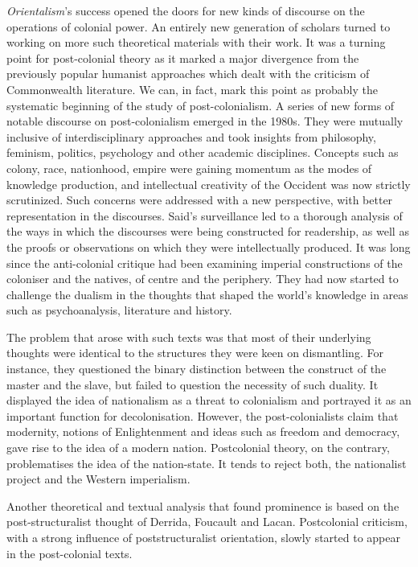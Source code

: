 \emph{Orientalism}’s success opened the doors for new kinds of discourse on the operations of colonial power. An entirely new generation of scholars turned to working on more such theoretical materials with their work. It was a turning point for post-colonial theory as it marked a major divergence from the previously popular humanist approaches which dealt with the criticism of Commonwealth literature. We can, in fact, mark this point as probably the systematic beginning of the study of post-colonialism. A series of new forms of notable discourse on post-colonialism emerged in the 1980s. They were mutually inclusive of interdisciplinary approaches and took insights from philosophy, feminism, politics, psychology and other academic disciplines. Concepts such as colony, race, nationhood, empire were gaining momentum as the modes of knowledge production, and intellectual creativity of the Occident was now strictly scrutinized. Such concerns were addressed with a new perspective, with better representation in the discourses. Said’s surveillance led to a thorough analysis of the ways in which the discourses were being constructed for readership, as well as the proofs or observations on which they were intellectually produced. It was long since the anti-colonial critique had been examining imperial constructions of the coloniser and the natives, of centre and the periphery. They had now started to challenge the dualism in the thoughts that shaped the world’s knowledge in areas such as psychoanalysis, literature and history.

The problem that arose with such texts was that most of their underlying thoughts were identical to the structures they were keen on dismantling. For instance, they questioned the binary distinction between the construct of the master and the slave, but failed to question the necessity of such duality. It displayed the idea of nationalism as a threat to colonialism and portrayed it as an important function for decolonisation. However, the post-colonialists claim that modernity, notions of Enlightenment and ideas such as freedom and democracy, gave rise to the idea of a modern nation. Postcolonial theory, on the contrary, problematises the idea of the nation-state. It tends to reject both, the nationalist project and the Western imperialism.

Another theoretical and textual analysis that found prominence is based on the post-structuralist thought of Derrida, Foucault and Lacan. Postcolonial criticism, with a strong influence of poststructuralist orientation, slowly started to appear in the post-colonial texts.

